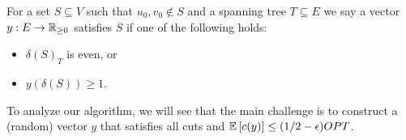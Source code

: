 \begin{definition}\label{def:satisfiedcuts}
\hypertarget{tar:satisfy}{For a set $S\subseteq V$ such that $u_0,v_0\notin S$ and a spanning tree $T\subseteq E$ we say a vector $y:E\to\mathbb{R}_{\geq 0}$ 	satisfies $S$ if one of the following holds:
\begin{itemize}
\item $\delta(S)_T$ is even, or
\item $y(\delta(S))\geq 1$.	
\end{itemize}}
\end{definition}
To analyze our algorithm, we will see that the main challenge is to construct a (random) vector $y$ that satisfies all  cuts and ${\mathbb{E}}\left[c(y)\right]\leq (1/2-{\epsilon})OPT$. 


%
%
%
%
%




